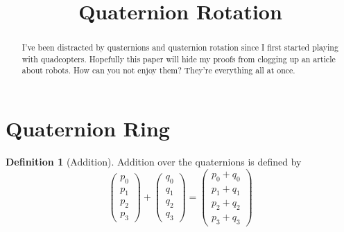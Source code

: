 \documentclass{amsart}
\theoremstyle{definition}
\newtheorem{definition}[theorem]{Definition}
\theoremstyle{remark}
\numberwithin{equation}{section}
\begin{document}
\title{Quaternion Rotation}


\begin{abstract}
I've been distracted by quaternions and quaternion rotation since I first started playing with quadcopters. Hopefully this paper will hide my proofs from clogging up an article about robots. How can you not enjoy them? They're everything all at once.
\end{abstract}

\maketitle


\section{Quaternion Ring}

\begin{definition}[Addition]
  Addition over the quaternions is defined by
  \begin{equation}
    \begin{pmatrix}
      p_0 \\
      p_1 \\
      p_2 \\
      p_3
    \end{pmatrix} +
    \begin{pmatrix}
      q_0 \\
      q_1 \\
      q_2 \\
      q_3
    \end{pmatrix} =
    \begin{pmatrix}
      p_0 + q_0 \\
      p_1 + q_1 \\
      p_2 + q_2 \\
      p_3 + q_3
    \end{pmatrix}
  \end{equation} 
\end{definition}
\end{document}
